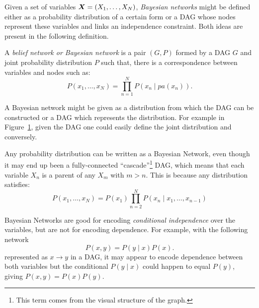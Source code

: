 
Given a set of variables \(\bm{X} = (X_{1},\dots,X_{N})\), \emph{Bayesian networks} might be defined either as a probability distribution of a certain form or a DAG whose nodes represent these variables and links an independence constraint. Both ideas are present in the following definition.

\begin{definition}
  A \emph{belief network or Bayesian network} is a pair \((G,P)\) formed by a DAG \(G\) and  joint probability distribution \(P\) such that, there is a correspondence between variables and nodes such as:
  \[
    P(x_{1},\dots,x_{N}) = \prod_{n=1}^{N}P(x_{n}\mid pa(x_{n})).
  \]
\end{definition}

\begin{remark}
  A Bayesian network might be given as a distribution from which the DAG can be constructed or a DAG which represents the distribution. For example in Figure~\ref{fig:bn_example}, given the DAG one could easily define the joint distribution and conversely.
\end{remark}

\begin{figure}[h!]
  \centering
    \label{fig:bn_example}
\end{figure}

Any probability distribution can be written as a Bayesian Network, even though
it may end up been a fully-connected ``cascade''\footnote{This term comes from the visual structure of the graph.} DAG, which means that each variable \( X_n \) is a parent of any \( X_m \) with \( m > n \). This is because any distribution satisfies:
\[
   P(x_1, \dots, x_{N}) = P(x_1) \prod_{n=2}^{N}P(x_{n} \mid x_{1},\dots, x_{n-1})
 \]

Bayesian Networks are good for encoding \emph{conditional independence} over the
variables, but are not for encoding dependence. For example, with the following
network
\[
P(x,y) = P(y\mid x)P(x).
\]
represented as \(x \to y\) in a DAG, it may appear to encode dependence between both variables but the conditional \(P(y\mid x)\) could happen to equal \(P(y)\), giving \(P(x,y) = P(x)P(y)\).

